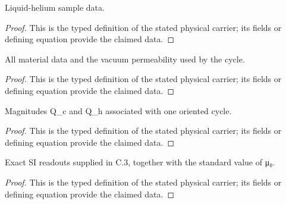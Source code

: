 \begin{definition}
  \label{def:physics:IPhO_2026_3_C_3:aux010}
  Liquid-helium sample data.
\end{definition}
\begin{proof}
  This is the typed definition of the stated physical carrier; its fields or defining equation provide the claimed data.
\end{proof}

\begin{definition}
  \label{def:physics:IPhO_2026_3_C_3:aux011}
  All material data and the vacuum permeability used by the cycle.
\end{definition}
\begin{proof}
  This is the typed definition of the stated physical carrier; its fields or defining equation provide the claimed data.
\end{proof}

\begin{definition}
  \label{def:physics:IPhO_2026_3_C_3:aux012}
  Magnitudes Q\_c and Q\_h associated with one oriented cycle.
\end{definition}
\begin{proof}
  This is the typed definition of the stated physical carrier; its fields or defining equation provide the claimed data.
\end{proof}

\begin{definition}
  \label{def:physics:IPhO_2026_3_C_3:aux013}
  Exact SI readouts supplied in C.3, together with the standard value of μ₀.
\end{definition}
\begin{proof}
  This is the typed definition of the stated physical carrier; its fields or defining equation provide the claimed data.
\end{proof}

